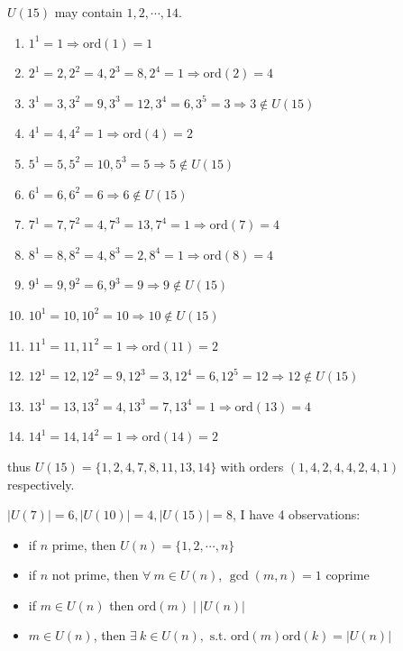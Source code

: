 \documentclass[11pt]{homework}
\newcommand{\est}{\exists\ }
\newcommand{\fal}{\forall\ }
\newcommand{\st}{\text{ s.t. }}
\newcommand{\ord}{\mathrm{ord}}
\begin{document}
\begin{alphaparts}
    \questionpart $U(15)$ may contain $1,2,\cdots,14$.
    \begin{enumerate}[label=\protect\textcircled{\tiny\arabic*}]
        \item $1^1=1 \Rightarrow \ord(1)=1$
        \item $2^1=2,2^2=4,2^3=8,2^4=1 \Rightarrow \ord(2)=4$
        \item $3^1=3,3^2=9,3^3=12,3^4=6,3^5=3 \Rightarrow 3\notin U(15)$
        \item $4^1=4,4^2=1 \Rightarrow \ord(4)=2 $
        \item $5^1=5,5^2=10,5^3=5 \Rightarrow 5 \notin U(15)$
        \item $6^1=6,6^2=6 \Rightarrow 6 \notin U(15)$
        \item $7^1=7,7^2=4,7^3=13,7^4=1 \Rightarrow \ord(7)=4$
        \item $8^1=8,8^2=4,8^3=2,8^4=1 \Rightarrow \ord(8)=4$
        \item $9^1=9,9^2=6,9^3=9 \Rightarrow 9 \notin U(15)$
        \item $10^1=10,10^2=10 \Rightarrow 10 \notin U(15)$
        \item $11^1=11,11^2=1 \Rightarrow \ord(11)=2$
        \item $12^1=12,12^2=9,12^3=3,12^4=6,12^5=12 \Rightarrow 12 \notin U(15)$
        \item $13^1=13,13^2=4,13^3=7,13^4=1 \Rightarrow \ord(13)=4$
        \item $14^1=14,14^2=1 \Rightarrow \ord(14)=2$
    \end{enumerate}
    thus $U(15)=\{1,2,4,7,8,11,13,14\}$ with orders $(1,4,2,4,4,2,4,1)$ respectively.

    \questionpart $|U(7)|=6,|U(10)|=4,|U(15)|=8$, I have 4 observations:
    \begin{itemize}
        \item if $n$ prime, then $U(n)=\{1,2,\cdots,n\}$
        \item if $n$ not prime, then $\fal m \in U(n)$, $\gcd(m,n)=1$ coprime
        \item if $m \in U(n)$ then $\ord(m)\mid|U(n)|$
        \item $m \in U(n)$, then $\est k \in U(n),\st\ord(m)\ord(k)=|U(n)|$
    \end{itemize}
\end{alphaparts}
\end{document}
